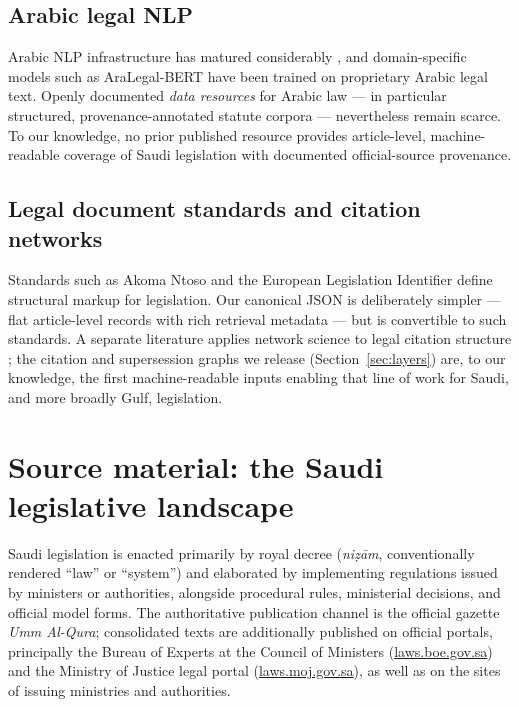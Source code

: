 \documentclass[sn-basic]{sn-jnl}%
\begin{document}
\subsection{Arabic legal NLP}

Arabic NLP infrastructure has matured considerably
\citep[e.g.,][]{antoun2020arabert, obeid2020camel}, and domain-specific
models such as AraLegal-BERT \citep{alqurishi2022aralegal} have been trained
on proprietary Arabic legal text. Openly documented \emph{data resources}
for Arabic law --- in particular structured, provenance-annotated statute
corpora --- nevertheless remain scarce. To our knowledge, no prior published
resource provides article-level, machine-readable coverage of Saudi
legislation with documented official-source provenance.

\subsection{Legal document standards and citation networks}

Standards such as Akoma Ntoso \citep{palmirani2011akoma} and the European
Legislation Identifier define structural markup for legislation. Our
canonical JSON is deliberately simpler --- flat article-level records with
rich retrieval metadata --- but is convertible to such standards. A separate
literature applies network science to legal citation structure
\citep{fowler2007network, katz2014complexity, coupette2021measuring}; the
citation and supersession graphs we release (Section~\ref{sec:layers}) are,
to our knowledge, the first machine-readable inputs enabling that line of
work for Saudi, and more broadly Gulf, legislation.

\section{Source material: the Saudi legislative landscape}
\label{sec:sources}

Saudi legislation is enacted primarily by royal decree
(\emph{ni\d{z}\={a}m}, conventionally rendered ``law'' or ``system'') and
elaborated by implementing regulations issued by ministers or authorities,
alongside procedural rules, ministerial decisions, and official model forms.
The authoritative publication channel is the official gazette \emph{Umm
Al-Qura}; consolidated texts are additionally published on official portals,
principally the Bureau of Experts at the Council of Ministers
(\url{laws.boe.gov.sa}) and the Ministry of Justice legal portal
(\url{laws.moj.gov.sa}), as well as on the sites of issuing ministries and
authorities.
\end{document}
